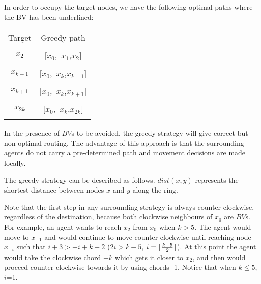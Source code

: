\noindent In order to occupy the target nodes, we have the following optimal paths where the BV has been underlined:

\begin{center}
  \begin{tabular}{|c|c|}
 \hline
 Target & Greedy path  \\
 &\\
 \hline
$x_2$ &$[x_0,$ \underline{$x_1$},$x_2]$\\
&\\
\hline
 $x_{k-1}$ & $[x_0,$ \underline{$x_k$},$x_{k-1}]$\\
 &\\
 \hline
 $x_{k+1}$ & $[x_0,$ \underline{$x_k$},$x_{k+1}]$\\
 &\\
 \hline
 $x_{2k}$ & $[x_0,$ \underline{$x_k$},$x_{2k}]$\\
 &\\
\hline
\end{tabular}
 
 \end{center}
  
  
In the presence of $BV$s to be avoided, the greedy strategy will give correct but non-optimal routing. 
The advantage of this approach is that the surrounding 
agents do not carry a pre-determined path  and movement decisions are made locally.
 

 The greedy strategy can be described as follows. $dist(x,y)$ represents the shortest distance between nodes  $x$ and $y$ along the ring.
\begin{center}
\end{center}
 
Note that the first step in any surrounding strategy is  always counter-clockwise, regardless of the destination, because both clockwise neighbours of $x_0$ are $BV$s. For example, an agent wants to reach $x_2$ from $x_0$ when $k>5$.  The agent would move to $x_{-1}$ and would continue to move counter-clockwise until reaching node $x_{-i}$ such that $i+3> -i+k-2$ ($2i>k-5$, $i =  \lceil{{ k-5} \over 2}\rceil$).
At this point the agent would take the clockwise chord $+k$ which gets it closer to $x_2$, and then would proceed counter-clockwise towards it by using chords -1. Notice that when $k\leq5$, $i$=1.

